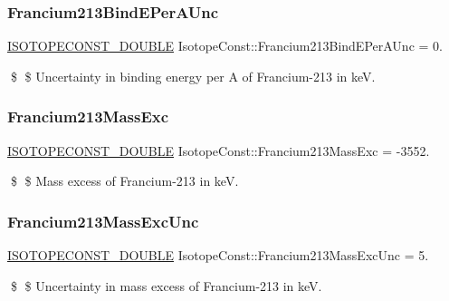 \subsubsection{\texorpdfstring{Francium213\+Bind\+E\+Per\+A\+Unc}{Francium213BindEPerAUnc}}
{\footnotesize\ttfamily \mbox{\hyperlink{group___isotope_const-_macros_ga8f45a7272ce02c0b4c65c44636ed719a}{I\+S\+O\+T\+O\+P\+E\+C\+O\+N\+S\+T\+\_\+\+D\+O\+U\+B\+LE}} Isotope\+Const\+::\+Francium213\+Bind\+E\+Per\+A\+Unc = 0.}

\$ \$ Uncertainty in binding energy per A of Francium-\/213 in keV. \mbox{\label{group___isotope_const-_francium-_fr213_gab3ac2866f7d87dc4ddd93857082e579b}} 
\subsubsection{\texorpdfstring{Francium213\+Mass\+Exc}{Francium213MassExc}}
{\footnotesize\ttfamily \mbox{\hyperlink{group___isotope_const-_macros_ga8f45a7272ce02c0b4c65c44636ed719a}{I\+S\+O\+T\+O\+P\+E\+C\+O\+N\+S\+T\+\_\+\+D\+O\+U\+B\+LE}} Isotope\+Const\+::\+Francium213\+Mass\+Exc = -\/3552.}

\$ \$ Mass excess of Francium-\/213 in keV. \mbox{\label{group___isotope_const-_francium-_fr213_ga117693967e03b268d32656a0951694b3}} 
\subsubsection{\texorpdfstring{Francium213\+Mass\+Exc\+Unc}{Francium213MassExcUnc}}
{\footnotesize\ttfamily \mbox{\hyperlink{group___isotope_const-_macros_ga8f45a7272ce02c0b4c65c44636ed719a}{I\+S\+O\+T\+O\+P\+E\+C\+O\+N\+S\+T\+\_\+\+D\+O\+U\+B\+LE}} Isotope\+Const\+::\+Francium213\+Mass\+Exc\+Unc = 5.}

\$ \$ Uncertainty in mass excess of Francium-\/213 in keV. \mbox{\label{group___isotope_const-_francium-_fr213_ga566ddf7fa5a3a56496dc3e7ca8b79299}} 
